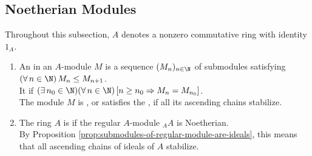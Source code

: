 \subsection{Noetherian Modules}

Throughout this subsection, $A$ denotes a nonzero commutative ring with identity $1_A$.

\begin{definition} \label{def:noetherian-module-ring-acc} 
\begin{enumerate}[label=(\roman*)]
\setlength{\itemsep}{0pt}
\item An  in an $A$-module $M$ is a sequence $(M_n)_{n\in\N}$ of submodules satisfying $(\forall\,n\in\N)\,M_n\leq M_{n+1}$.\\
It  if $(\exists\,n_0\in\N)(\forall\,n\in\N)\,[n\geq n_0\Rightarrow M_n=M_{n_0}]$.\\
The module $M$ is , or satisfies the , if all its ascending chains stabilize.
\item The ring $A$ is  if the regular $A$-module ${}_A A$ is Noetherian.\\
By Proposition \ref{prop:submodules-of-regular-module-are-ideals}, this means that all ascending chains of ideals of $A$ stabilize.
\end{enumerate}
\end{definition}

